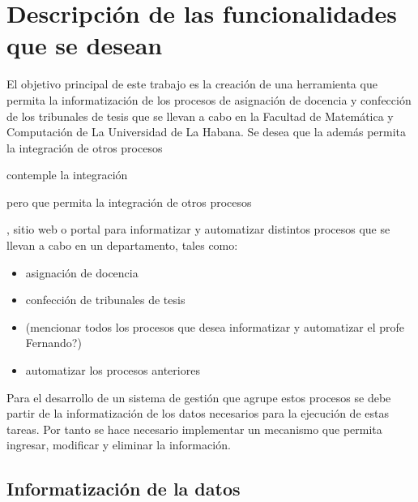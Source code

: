 \chapter{Descripción de las funcionalidades que se desean}\label{chapter:features}
El objetivo principal de este trabajo es la creación de
una herramienta que permita la informatización de los procesos
de asignación de docencia y confección de los tribunales de tesis que se llevan a cabo en la Facultad de Matemática y Computación
de La Universidad de La Habana. Se desea que la  además permita la integración de otros procesos 

contemple la integración 

pero que permita la integración de otros procesos 

, sitio web o portal para informatizar
y automatizar distintos procesos que se llevan a cabo 
en un departamento, tales como:

\begin{itemize}
    \item asignación de docencia
    \item confección de tribunales de tesis
    \item (mencionar todos los procesos que desea informatizar y automatizar el profe Fernando?)
    \item automatizar los procesos anteriores
\end{itemize}


Para el desarrollo de un sistema de gestión que agrupe estos 
procesos se debe partir de la informatización de los datos necesarios 
para la ejecución de estas tareas. Por tanto se hace necesario 
implementar un mecanismo que permita ingresar, modificar y eliminar
la información. 



\section{Informatización de la datos}





